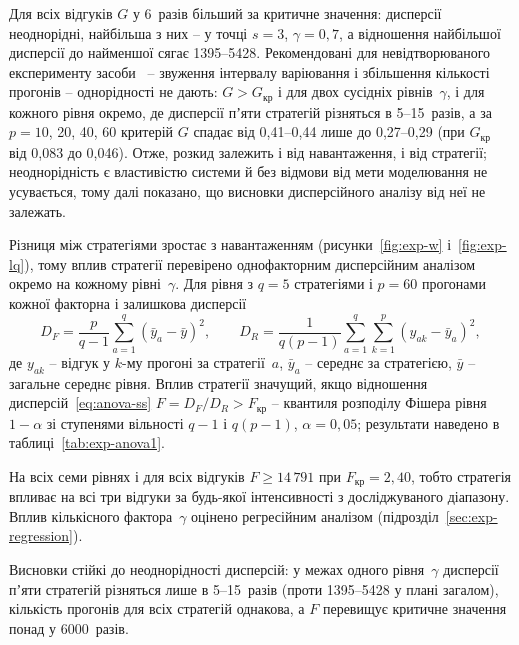 Для всіх відгуків $G$ у 6~разів більший за критичне значення:
дисперсії неоднорідні, найбільша з них -- у точці $s = 3$, $\gamma = 0{,}7$, а відношення
найбільшої дисперсії до найменшої сягає 1395--5428. Рекомендовані для невідтворюваного
експерименту засоби~\cite{stetsenko-modeling} -- звуження інтервалу варіювання і збільшення
кількості прогонів -- однорідності не дають: $G > G_{\text{кр}}$ і для двох сусідніх рівнів~$\gamma$,
і для кожного рівня окремо, де дисперсії пʼяти стратегій різняться в 5--15~разів, а за
$p = 10$, 20, 40, 60 критерій $G$ спадає від 0,41--0,44 лише до 0,27--0,29 (при $G_{\text{кр}}$ від
0,083 до 0,046). Отже, розкид залежить і від навантаження, і від стратегії; неоднорідність є
властивістю системи й без відмови від мети моделювання не усувається, тому далі показано, що
висновки дисперсійного аналізу від неї не залежать.

Різниця між стратегіями зростає з навантаженням (рисунки~\ref{fig:exp-w} і~\ref{fig:exp-lq}),
тому вплив стратегії перевірено однофакторним дисперсійним аналізом~\cite{stetsenko-kursova}
окремо на кожному рівні~$\gamma$. Для рівня з $q = 5$ стратегіями і $p = 60$ прогонами кожної
факторна і залишкова дисперсії
\begin{equation}\label{eq:anova-ss}
  D_F = \frac{p}{q-1}\sum_{a=1}^{q}\left(\bar y_a - \bar y\right)^2, \qquad
  D_R = \frac{1}{q(p-1)}\sum_{a=1}^{q}\sum_{k=1}^{p}\left(y_{ak} - \bar y_a\right)^2,
\end{equation}
де $y_{ak}$ -- відгук у $k$-му прогоні за стратегії~$a$, $\bar y_a$ -- середнє за стратегією,
$\bar y$ -- загальне середнє рівня. Вплив стратегії значущий, якщо відношення дисперсій~\eqref{eq:anova-ss} $F = D_F/D_R > F_{\text{кр}}$ --
квантиля розподілу Фішера рівня $1-\alpha$ зі ступенями вільності $q-1$ і $q(p-1)$,
$\alpha = 0{,}05$; результати наведено в таблиці~\ref{tab:exp-anova1}.



На всіх семи рівнях і для всіх відгуків $F \ge 14\,791$ при $F_{\text{кр}} = 2{,}40$, тобто
стратегія впливає на всі три відгуки за будь-якої інтенсивності з досліджуваного діапазону.
Вплив кількісного фактора~$\gamma$ оцінено регресійним аналізом
(підрозділ~\ref{sec:exp-regression}).

Висновки стійкі до неоднорідності дисперсій: у межах одного рівня~$\gamma$ дисперсії пʼяти
стратегій різняться лише в 5--15~разів (проти 1395--5428 у плані загалом), кількість прогонів
для всіх стратегій однакова, а $F$ перевищує критичне значення понад у 6000~разів.


